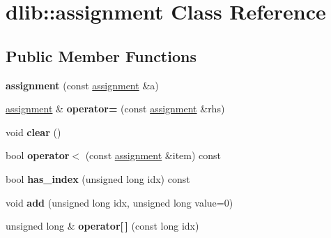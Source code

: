 \hypertarget{classdlib_1_1assignment}{
\section{dlib::assignment Class Reference}
\label{classdlib_1_1assignment}
}
\subsection*{Public Member Functions}
\begin{DoxyCompactItemize}
\item 
\hypertarget{classdlib_1_1assignment_a71173dd08edc8bb2a063b207cba1d3f4}{
{\bfseries assignment} (const \hyperlink{classdlib_1_1assignment}{assignment} \&a)}
\label{classdlib_1_1assignment_a71173dd08edc8bb2a063b207cba1d3f4}

\item 
\hypertarget{classdlib_1_1assignment_aa9fc8e7b66424499b40d46263a9c7588}{
\hyperlink{classdlib_1_1assignment}{assignment} \& {\bfseries operator=} (const \hyperlink{classdlib_1_1assignment}{assignment} \&rhs)}
\label{classdlib_1_1assignment_aa9fc8e7b66424499b40d46263a9c7588}

\item 
\hypertarget{classdlib_1_1assignment_ab045b6e4070f1eac80c8c5291643ba28}{
void {\bfseries clear} ()}
\label{classdlib_1_1assignment_ab045b6e4070f1eac80c8c5291643ba28}

\item 
\hypertarget{classdlib_1_1assignment_a6a728f803e5a94351a6b91d039d532de}{
bool {\bfseries operator$<$} (const \hyperlink{classdlib_1_1assignment}{assignment} \&item) const }
\label{classdlib_1_1assignment_a6a728f803e5a94351a6b91d039d532de}

\item 
\hypertarget{classdlib_1_1assignment_a7029eba2c663f2ceacb66e2800db2a19}{
bool {\bfseries has\_\-index} (unsigned long idx) const }
\label{classdlib_1_1assignment_a7029eba2c663f2ceacb66e2800db2a19}

\item 
\hypertarget{classdlib_1_1assignment_abdf328b4deae98e8e8d91895805d534f}{
void {\bfseries add} (unsigned long idx, unsigned long value=0)}
\label{classdlib_1_1assignment_abdf328b4deae98e8e8d91895805d534f}

\item 
\hypertarget{classdlib_1_1assignment_a2dc646524f0dc2ff2db657e3de716f72}{
unsigned long \& {\bfseries operator\mbox{[}$\,$\mbox{]}} (const long idx)}
\label{classdlib_1_1assignment_a2dc646524f0dc2ff2db657e3de716f72}


\end{DoxyCompactItemize}
